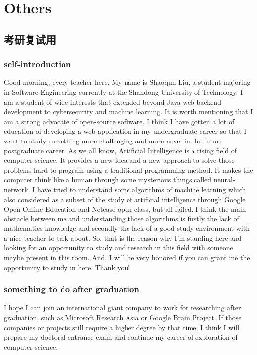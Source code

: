 \documentclass[main.tex]{subfiles}
\begin{document}
\chapter{Others}
\section{考研复试用}
\subsection{self-introduction}
Good morning, every teacher here, My name is Shaoqun Liu, a student majoring in Software Engineering currently at the Shandong University of Technology. I am a student of wide interests that extended beyond Java web backend development to cybersecurity and machine learning. It is worth mentioning that I am a strong advocate of open-source software. I think I have gotten a lot of education of developing a web application in my undergraduate career so that I want to study something more challenging and more novel in the future postgraduate career. As we all know, Artificial Intelligence is a rising field of computer science. It provides a new idea and a new approach to solve those problems hard to program using a traditional programming method. It makes the computer think like a human through some mysterious things called neural-network. I have tried to understand some algorithms of machine learning which also considered as a subset of the study of artificial intelligence through Google Open Online Education and Netease open class, but all failed. I think the main obstacle between me and understanding those algorithms is firstly the lack of mathematics knowledge and secondly the lack of a good study environment with a nice teacher to talk about. So, that is the reason why I'm standing here and looking for an opportunity to study and research in this field with someone maybe present in this room. And, I will be very honored if you can grant me the opportunity to study in here. Thank you!

\subsection{something to do after graduation}
I hope I can join an international giant company to work for researching after graduation, such as Microsoft Research Asia or Google Brain Project. If those companies or projects still require a higher degree by that time, I think I will prepare my doctoral entrance exam and continue my career of exploration of computer science.
\end{document}
